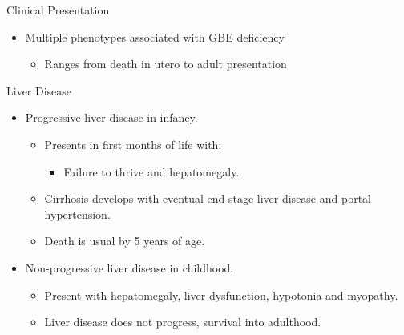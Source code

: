 \documentclass[presentation, smaller]{beamer}
\begin{document}
\begin{frame}[label={sec:org6bcc8af}]{Clinical Presentation}
\begin{itemize}
\item Multiple phenotypes associated with GBE deficiency
\begin{itemize}
\item Ranges from death in utero to adult presentation
\end{itemize}
\end{itemize}

\begin{block}{Liver Disease}
\begin{itemize}
\item Progressive liver disease in infancy.
\begin{itemize}
\item Presents in first months of life with:
\begin{itemize}
\item Failure to thrive and hepatomegaly.
\end{itemize}
\item Cirrhosis develops with eventual end stage liver disease and
portal hypertension.
\item Death is usual by 5 years of age.
\end{itemize}
\item Non-progressive liver disease in childhood.
\begin{itemize}
\item Present with hepatomegaly, liver dysfunction, hypotonia and
myopathy.
\item Liver disease does not progress, survival into adulthood.
\end{itemize}
\end{itemize}
\end{block}
\end{frame}
\end{document}
